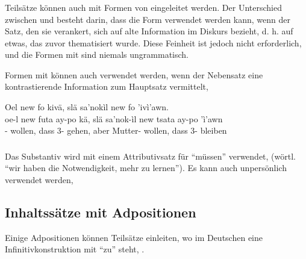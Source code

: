 \subsubsection{} Teilsätze können auch mit Formen von  eingeleitet werden. Der Unterschied zwischen  und  besteht darin, dass die Form  verwendet werden kann, wenn der Satz, den sie verankert, sich auf alte Information im Diskurs bezieht, d. h. auf etwas, das zuvor thematisiert wurde. Diese Feinheit ist jedoch nicht erforderlich, und die Formen mit  sind niemals ungrammatisch. 

Formen mit  können auch verwendet werden, wenn der Nebensatz eine kontrastierende Information zum Hauptsatz vermittelt,

\begin{interlin}
	\glll Oel new  fo kivä, slä sa'nokìl new  fo 'ivì'awn. \\
	oe-l new futa ay-po kä, slä sa'nok-ìl new tsata ay-po 'ì'awn\\
	- wollen, dass 3- gehen, aber Mutter- wollen, dass 3- bleiben \\
\end{interlin}

\subsubsection{} Das Substantiv   wird mit einem Attributivsatz für ``müssen'' verwendet,   (wörtl. ``wir haben die Notwendigkeit, mehr zu lernen''). 
Es kann auch unpersönlich verwendet werden,  

\subsection{Inhaltssätze mit Adpositionen} Einige Adpositionen können Teilsätze einleiten, wo im Deutschen eine Infinitivkonstruktion mit ``zu'' steht,  .
\label{syn:rel:nom-adp}

